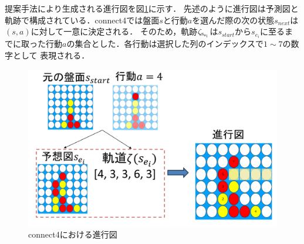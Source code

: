 提案手法により生成される進行図を図\ref{fig:double}に示す．
先述のように進行図は予測図と軌跡で構成されている．connect4では盤面$s$と行動$a$を選んだ際の次の状態$s_{next}$は$(s, a)$に対して一意に決定される．
そのため，軌跡$\rm{{\zeta}_{s_{e_i}}}$は$s_{start}$から$s_{e_i}$に至るまでに取った行動$a$の集合とした．各行動は選択した列のインデックスで$1\sim7$の数字として
表現される．
\begin{figure}[htbp]
	\centering
	\includegraphics[width=\linewidth]{./figure/double.png}
	\caption{connect4における進行図}
	\label{fig:double}
\end{figure}
\pagebreak